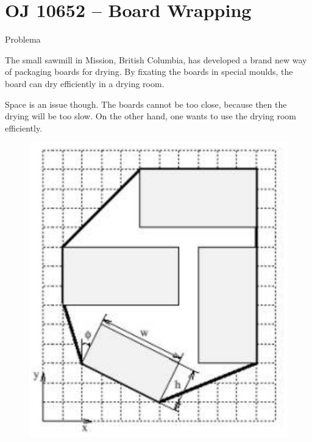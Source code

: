 \section{OJ 10652 -- Board Wrapping}

\begin{frame}[fragile]{Problema}

\begin{minipage}{0.5\textwidth}
The small sawmill in Mission, British Columbia, has
developed a brand new way of packaging boards for
drying. By fixating the boards in special moulds, the
board can dry efficiently in a drying room.

Space is an issue though. The boards cannot be
too close, because then the drying will be too slow.
On the other hand, one wants to use the drying room
efficiently.
\end{minipage}
\begin{minipage}{0.45\textwidth}
\begin{figure}
    \centering
    \includegraphics[scale=0.6]{10652.png}
\end{figure}
\end{minipage}

\end{frame}

